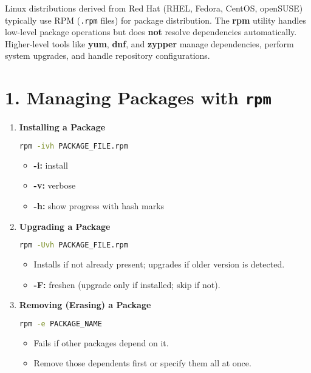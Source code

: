 \documentclass[a4paper]{report}
\begin{document}
Linux distributions derived from Red Hat (RHEL, Fedora, CentOS, openSUSE) typically use RPM (\texttt{.rpm} files) for package distribution. The \textbf{rpm} utility handles low-level package operations but does \textbf{not} resolve dependencies automatically. Higher-level tools like \textbf{yum}, \textbf{dnf}, and \textbf{zypper} manage dependencies, perform system upgrades, and handle repository configurations.

\section*{1. Managing Packages with \texttt{rpm}}
\begin{enumerate}
    \item \textbf{Installing a Package}
\begin{lstlisting}[language=bash]
rpm -ivh PACKAGE_FILE.rpm
\end{lstlisting}
\begin{itemize}
    \item \textbf{-i:} install
    \item \textbf{-v:} verbose
    \item \textbf{-h:} show progress with hash marks
\end{itemize}

\item \textbf{Upgrading a Package}
\begin{lstlisting}[language=bash]
rpm -Uvh PACKAGE_FILE.rpm
\end{lstlisting}
\begin{itemize}
    \item Installs if not already present; upgrades if older version is detected.
    \item \textbf{-F:} freshen (upgrade only if installed; skip if not).
\end{itemize}

\item \textbf{Removing (Erasing) a Package}
\begin{lstlisting}[language=bash]
rpm -e PACKAGE_NAME
\end{lstlisting}
\begin{itemize}
    \item Fails if other packages depend on it.
    \item Remove those dependents first or specify them all at once.
\end{itemize}


\end{enumerate}
\end{document}
